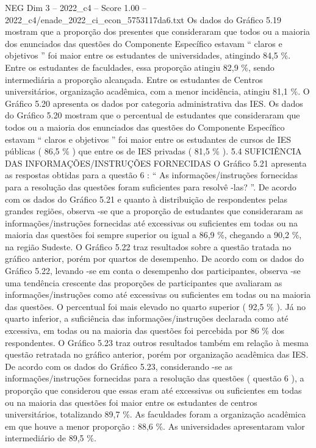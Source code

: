 \begin{textsample}{NEG Dim 3 – 2022\_c4 – Score 1.00 – 2022\_c4/enade\_2022\_ci\_econ\_5753117da6.txt}
Os dados do Gráfico 5.19 mostram que a proporção dos presentes que consideraram que todos ou a maioria dos enunciados das questões do Componente Específico estavam “ claros e objetivos ” foi maior entre os estudantes de universidades, atingindo 84,5 \%.
Entre os estudantes de faculdades, essa proporção atingiu 82,9 \%, sendo intermediária a proporção alcançada.
Entre os estudantes de Centros universitários, organização acadêmica, com a menor incidência, atingiu 81,1 \%.
O Gráfico 5.20 apresenta os dados por categoria administrativa das IES.
Os dados do Gráfico 5.20 mostram que o percentual de estudantes que consideraram que todos ou a maioria dos enunciados das questões do Componente Específico estavam “ claros e objetivos ” foi maior entre os estudantes de cursos de IES públicas ( 86,5 \% ) que entre os de IES privadas ( 81,5 \% ). 5.4 SUFICIÊNCIA DAS INFORMAÇÕES/INSTRUÇÕES FORNECIDAS O Gráfico 5.21 apresenta as respostas obtidas para a questão 6 : “ As informações/instruções fornecidas para a resolução das questões foram suficientes para resolvê -las? ”.
De acordo com os dados do Gráfico 5.21 e quanto à distribuição de respondentes pelas grandes regiões, observa -se que a proporção de estudantes que consideraram as informações/instruções fornecidas até excessivas ou suficientes em todas ou na maioria das questões foi sempre superior ou igual a 86,9 \%, chegando a 90,2 \%, na região Sudeste.
O Gráfico 5.22 traz resultados sobre a questão tratada no gráfico anterior, porém por quartos de desempenho.
De acordo com os dados do Gráfico 5.22, levando -se em conta o desempenho dos participantes, observa -se uma tendência crescente das proporções de participantes que avaliaram as informações/instruções como até excessivas ou suficientes em todas ou na maioria das questões.
O percentual foi mais elevado no quarto superior ( 92,5 \% ).
Já no quarto inferior, a suficiência das informações/instruções declarada como até excessiva, em todas ou na maioria das questões foi percebida por 86 \% dos respondentes.
O Gráfico 5.23 traz outros resultados também em relação à mesma questão retratada no gráfico anterior, porém por organização acadêmica das IES.
De acordo com os dados do Gráfico 5.23, considerando -se as informações/instruções fornecidas para a resolução das questões ( questão 6 ), a proporção que considerou que essas eram até excessivas ou suficientes em todas ou na maioria das questões foi maior entre os estudantes de centros universitários, totalizando 89,7 \%.
As faculdades foram a organização acadêmica em que houve a menor proporção : 88,6 \%.
As universidades apresentaram valor intermediário de 89,5 \%.

\end{textsample}
